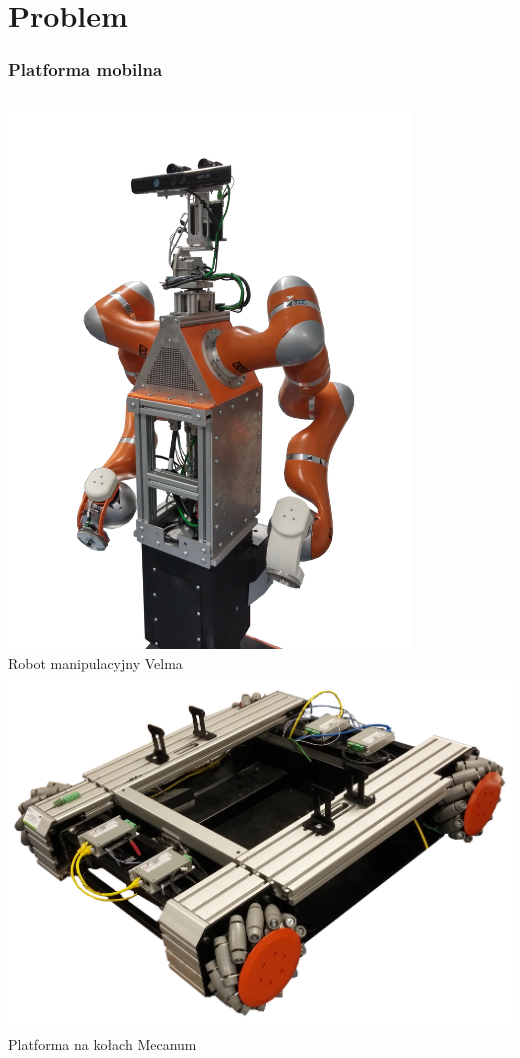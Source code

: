 \documentclass{beamer}
\begin{document}
	\section{Problem}
	\begin{frame}
		\frametitle{Platforma mobilna}
		\begin{columns}[c]
			\centering
			\includegraphics[width=0.8\textwidth]{graphics/velma.png} \\
			Robot manipulacyjny Velma
			\centering
			\includegraphics[width=\textwidth]{graphics/omnivelma.png} \\
			Platforma na kołach Mecanum
		\end{columns}
	\end{frame}
\end{document}
